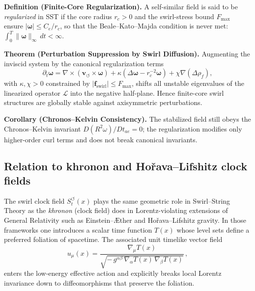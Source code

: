 \documentclass[10pt,reprint,aps,onecolumn,nofootinbib]{revtex4-2}
\begin{document}
    \textbf{Definition (Finite-Core Regularization).}
    A self-similar field is said to be \emph{regularized} in SST if the core radius
    \(r_c>0\) and the swirl-stress bound \(F_{\max}\) ensure
    \(|\boldsymbol{\omega}| \le C_e/r_c\),
    so that the Beale–Kato–Majda condition is never met:
    \(\displaystyle \int_0^T \|\boldsymbol{\omega}\|_{\infty}\,dt < \infty.\)

    \textbf{Theorem (Perturbation Suppression by Swirl Diffusion).}
    Augmenting the inviscid system by the canonical regularization terms
    \begin{equation}
        \partial_t\boldsymbol{\omega}
        = \nabla\times(\mathbf{v}_{\!\boldsymbol{\circlearrowleft}}\!\times\!\boldsymbol{\omega})
        +\kappa(\Delta\boldsymbol{\omega}-r_c^{-2}\boldsymbol{\omega})
        +\chi\nabla(\Delta\rho_{\!f}),
    \end{equation}
    with $\kappa,\chi>0$ constrained by $|\mathbf{f}_{\text{swirl}}|\!\le\! F_{\max}$,
    shifts all unstable eigenvalues of the linearized operator
    $\mathcal{L}$ into the negative half-plane.
    Hence finite-core swirl structures are globally stable against axisymmetric perturbations.

    \textbf{Corollary (Chronos–Kelvin Consistency).}
    The stabilized field still obeys the Chronos–Kelvin invariant
    \(\displaystyle D(R^2\omega)/Dt_{\!ae}=0\);
    the regularization modifies only higher-order curl terms and does not break canonical invariants.

    \subsection{Relation to khronon and Hořava--Lifshitz clock fields}
            \label{subsec:swirl_clock_khronon_relation}

            The swirl clock field \(S_t^{\boldsymbol{\circlearrowleft}}(x)\) plays the same
            geometric role in Swirl--String Theory as the \emph{khronon} (clock field)
            does in Lorentz-violating extensions of General Relativity such as
            Einstein--Æther and Hořava--Lifshitz gravity.\cite{Horava2009LifshitzPoint,EinsteinAetherReview}
            In those frameworks one introduces a scalar time function \(T(x)\) whose
            level sets define a preferred foliation of spacetime. The associated
            unit timelike vector field
            \begin{equation}
                u_\mu(x)
                =
                \frac{\nabla_\mu T(x)}{\sqrt{-\,g^{\alpha\beta}\,\nabla_\alpha T(x)\,\nabla_\beta T(x)}}
                \,,
                \label{eq:khronon_unit_vector}
            \end{equation}
            enters the low-energy effective action and explicitly breaks local Lorentz
            invariance down to diffeomorphisms that preserve the foliation.
\end{document}
